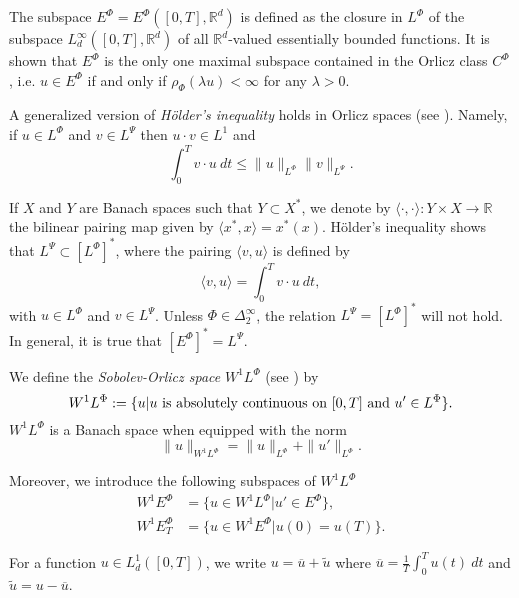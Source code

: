 \documentclass[twoside]{article}
\theoremstyle{remark}
\newcommand{\orlnor}{\|_{L^{\Phi}}}
\newcommand{\lphi}{L^{\Phi}}
\newcommand{\lpsi}{L^{\Psi}}
\newcommand{\ephi}{E^{\Phi}}
\newcommand{\claseor}{C^{\Phi}}
\newcommand{\wphi}{W^{1}\lphi}
\newcommand{\wphie}{W^{1}\ephi}
\newcommand{\rr}{\mathbb{R}}
\renewcommand{\leq}{\leqslant}
\begin{document}
The subspace $\ephi=\ephi([0,T],\rr^d)$ is defined as the closure in $\lphi$ of the subspace $L^{\infty}_d([0,T],\rr^d)$ of all $\mathbb{R}^d$-valued essentially bounded functions. It is shown that  $\ephi$ is the only one maximal subspace contained in the Orlicz class $\claseor$, i.e.
$u\in\ephi$ if and only if $\rho_{\Phi}(\lambda u)<\infty$ for any $\lambda>0$.

A generalized version of \emph{H\"older's inequality} holds in Orlicz spaces (see \cite[Thm. 9.3]{KR}). Namely, if $u\in\lphi$ and $v\in\lpsi$ then $u\cdot v\in L^1$ and
\begin{equation}\label{holder}
\int_0^Tv\cdot u\ dt\leq \|u\orlnor\|v\|_{L^{\Psi}}.
\end{equation}




If $X$ and $Y$ are  Banach spaces such that  $Y\subset X^*$, we denote by $\langle\cdot,\cdot\rangle:Y\times X\to\mathbb{R}$ the bilinear pairing  map given by $\langle x^*,x\rangle=x^*(x)$. H\"older's inequality shows that $\lpsi\subset \left[\lphi\right]^*$, where the pairing
$\langle v, u\rangle$
is defined by 
\begin{equation}\label{pairing}
  \langle v,u\rangle=\int_0^Tv\cdot u\ dt,
\end{equation}
with  $u\in\lphi$ and $v\in\lpsi$.
 Unless $\Phi \in \Delta_2^{\infty}$, the relation $\lpsi= \left[\lphi\right]^*$ will not hold. In general, it is true  that  $\left[\ephi\right]^*=\lpsi$.



We define the \emph{Sobolev-Orlicz space} $\wphi$ (see \cite{adams_sobolev}) by
\[\wphi:=\{u| u \hbox{ is absolutely continuous on $[0,T]$ and } u'\in \lphi\}.\]
$\wphi$ is a Banach space when equipped with the norm
\begin{equation}\label{def-norma-orlicz-sob}
\|  u  \|_{\wphi}= \|  u  \|_{\lphi} + \|u'\orlnor.
\end{equation}

Moreover, we introduce the following subspaces of $\wphi$
\begin{equation}\label{def-esp-orlicz-sob-per}
\begin{split}
\wphie&=\{u\in\wphi|u'\in\ephi\},\\
\wphie_T&=\{u\in\wphie|u(0)=u(T)\}.
\end{split}
\end{equation}



For a  function $u\in L^1_d([0,T])$, we write $u=\overline{u}+\widetilde{u}$ where $\overline{u} =\frac1T\int_0^T u(t)\ dt$ and $\widetilde{u}=u-\overline{u}$.
\end{document}
